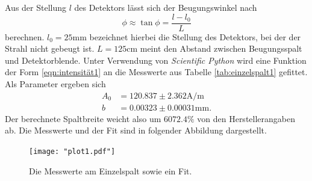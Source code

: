 \noindent
Aus der Stellung $l$ des Detektors lässt sich der Beugungswinkel nach
\begin{equation}
  \label{eqn:phiausw}
    \phi \approx \tan{\phi} = \frac{l-l_0}{L}
\end{equation}
berechnen. $l_0 = 25 \si{\milli\meter}$ bezeichnet hierbei die Stellung des Detektors, bei der der Strahl
nicht gebeugt ist. $L = 125 \si{\centi\meter}$ meint den Abstand zwischen Beugungsspalt und Detektorblende.
Unter Verwendung von \textit{Scientific Python} wird eine Funktion der Form \eqref{eqn:intensität1}
an die Messwerte aus Tabelle \ref{tab:einzelspalt1} gefittet. Als Parameter ergeben sich
\begin{align*}
  A_0 & = 120.837 \pm 2.362 \si{\ampere\per\meter}\\
  b   & = 0.00323 \pm 0.00031 \si{\milli\meter}.
\end{align*}
Der berechnete Spaltbreite weicht also um $6072.4 \si{\percent}$ von den Herstellerangaben ab.
Die Messwerte und der Fit sind in folgender Abbildung dargestellt.
\begin{figure}[H]
  \centering
  \texttt{[image: "plot1.pdf"]}
  \caption{Die Messwerte am Einzelspalt sowie ein Fit.}
  \label{fig:einzel}
\end{figure}
\noindent

